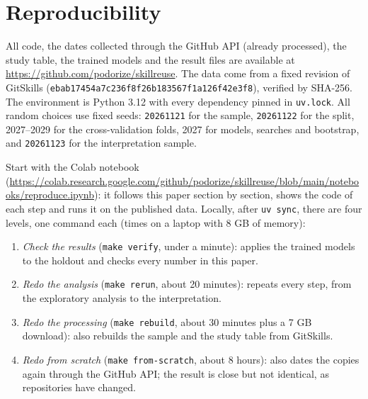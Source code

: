 \section{Reproducibility}\label{reproducibility}

All code, the dates collected through the GitHub API (already
processed), the study table, the trained models and the result files are
available at \url{https://github.com/podorize/skillreuse}. The data come
from a fixed revision of GitSkills
(\texttt{ebab17454a7c236f8f26b183567f1a126f42e3f8}), verified by
SHA-256. The environment is Python 3.12 with every dependency pinned in
\texttt{uv.lock}. All random choices use fixed seeds: \texttt{20261121}
for the sample, \texttt{20261122} for the split, 2027--2029 for the
cross-validation folds, 2027 for models, searches and bootstrap, and
\texttt{20261123} for the interpretation sample.

Start with the Colab notebook
(\url{https://colab.research.google.com/github/podorize/skillreuse/blob/main/notebooks/reproduce.ipynb}):
it follows this paper section by section, shows the code of each step
and runs it on the published data. Locally, after \texttt{uv\ sync},
there are four levels, one command each (times on a laptop with 8 GB of
memory):

\begin{enumerate}
\def\labelenumi{\arabic{enumi}.}
\tightlist
\item
  \emph{Check the results} (\texttt{make\ verify}, under a minute):
  applies the trained models to the holdout and checks every number in
  this paper.
\item
  \emph{Redo the analysis} (\texttt{make\ rerun}, about 20 minutes):
  repeats every step, from the exploratory analysis to the
  interpretation.
\item
  \emph{Redo the processing} (\texttt{make\ rebuild}, about 30 minutes
  plus a 7 GB download): also rebuilds the sample and the study table
  from GitSkills.
\item
  \emph{Redo from scratch} (\texttt{make\ from-scratch}, about 8 hours):
  also dates the copies again through the GitHub API; the result is
  close but not identical, as repositories have changed.
\end{enumerate}
